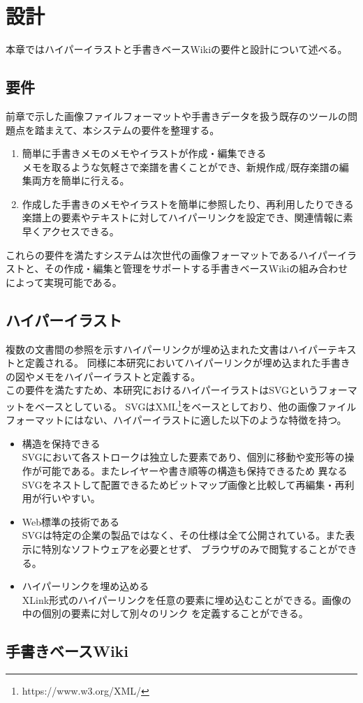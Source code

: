 \chapter{設計}
\label{chap:sekkei}

本章ではハイパーイラストと手書きベースWikiの要件と設計について述べる。

\newpage

\section{要件}
前章で示した画像ファイルフォーマットや手書きデータを扱う既存のツールの問題点を踏まえて、本システムの要件を整理する。
\begin{enumerate}
    \item 簡単に手書きメモのメモやイラストが作成・編集できる\\
    メモを取るような気軽さで楽譜を書くことができ、新規作成/既存楽譜の編集両方を簡単に行える。
    \item 作成した手書きのメモやイラストを簡単に参照したり、再利用したりできる\\
    楽譜上の要素やテキストに対してハイパーリンクを設定でき、関連情報に素早くアクセスできる。
\end{enumerate}
これらの要件を満たすシステムは次世代の画像フォーマットであるハイパーイラストと、その作成・編集と管理をサポートする手書きベースWikiの組み合わせによって実現可能である。

\section{ハイパーイラスト}
複数の文書間の参照を示すハイパーリンクが埋め込まれた文書はハイパーテキストと定義される。
同様に本研究においてハイパーリンクが埋め込まれた手書きの図やメモをハイパーイラストと定義する。\\
この要件を満たすため、本研究におけるハイパーイラストはSVG\cite{aboutsvg}というフォーマットをベースとしている。
SVGはXML\footnote{https://www.w3.org/XML/}をベースとしており、他の画像ファイルフォーマットにはない、ハイパーイラストに適した以下のような特徴を持つ。
\begin{itemize}
    \item 構造を保持できる\\
    SVGにおいて各ストロークは独立した要素であり、個別に移動や変形等の操作が可能である。またレイヤーや書き順等の構造も保持できるため
    異なるSVGをネストして配置できるためビットマップ画像と比較して再編集・再利用が行いやすい。
    \item Web標準の技術である\\
    SVGは特定の企業の製品ではなく、その仕様は全て公開されている。また表示に特別なソフトウェアを必要とせず、
    ブラウザのみで閲覧することができる。
    \item ハイパーリンクを埋め込める\\
    XLink形式のハイパーリンクを任意の要素に埋め込むことができる。画像の中の個別の要素に対して別々のリンク
    を定義することができる。
\end{itemize}

\section{手書きベースWiki}
